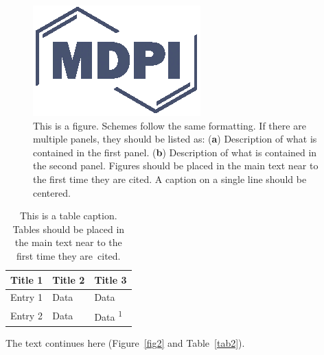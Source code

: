 \documentclass[journal,article,submit,pdftex,moreauthors]{Definitions/mdpi}
\begin{document}
\begin{figure}[H]
\includegraphics[width=10.5 cm]{Definitions/logo-mdpi}
\caption{This is a figure. Schemes follow the same formatting. If there are multiple panels, they should be listed as: (\textbf{a}) Description of what is contained in the first panel. (\textbf{b}) Description of what is contained in the second panel. Figures should be placed in the main text near to the first time they are cited. A caption on a single line should be centered.\label{fig1}}
\end{figure}   
\unskip

\begin{table}[H] 
\caption{This is a table caption. Tables should be placed in the main text near to the first time they are~cited.\label{tab1}}
\begin{tabularx}{\textwidth}{CCC}
\toprule
\textbf{Title 1}	& \textbf{Title 2}	& \textbf{Title 3}\\
\midrule
Entry 1		& Data			& Data\\
Entry 2		& Data			& Data \textsuperscript{1}\\
\bottomrule
\end{tabularx}
\end{table}

The text continues here (Figure~\ref{fig2} and Table~\ref{tab2}).
\end{document}
